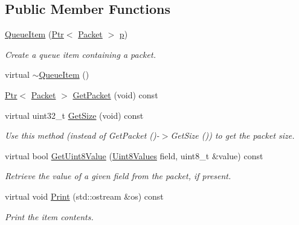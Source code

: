 \subsection*{Public Member Functions}
\begin{DoxyCompactItemize}
\item 
\hyperlink{classns3_1_1QueueItem_a9a8ffbf0ffed8686bf582062c6f69eb5}{Queue\+Item} (\hyperlink{classns3_1_1Ptr}{Ptr}$<$ \hyperlink{classns3_1_1Packet}{Packet} $>$ \hyperlink{lte__link__budget__x2__handover__measures_8m_ac9de518908a968428863f829398a4e62}{p})
\begin{DoxyCompactList}\small\item\em Create a queue item containing a packet. \end{DoxyCompactList}\item 
virtual \hyperlink{classns3_1_1QueueItem_ab61b8516ae949af67d70722c7cced634}{$\sim$\+Queue\+Item} ()
\item 
\hyperlink{classns3_1_1Ptr}{Ptr}$<$ \hyperlink{classns3_1_1Packet}{Packet} $>$ \hyperlink{classns3_1_1QueueItem_aa8c2a59b1600fa2cee783867704f9cce}{Get\+Packet} (void) const 
\item 
virtual uint32\+\_\+t \hyperlink{classns3_1_1QueueItem_afb2bd0a2029f3b59d9911fba013be2ea}{Get\+Size} (void) const 
\begin{DoxyCompactList}\small\item\em Use this method (instead of Get\+Packet ()-\/$>$Get\+Size ()) to get the packet size. \end{DoxyCompactList}\item 
virtual bool \hyperlink{classns3_1_1QueueItem_ae1a71fed25d4810dcc248dd1eb3006a0}{Get\+Uint8\+Value} (\hyperlink{classns3_1_1QueueItem_a9be6c7d46929336179fe00c3224eec9f}{Uint8\+Values} field, uint8\+\_\+t \&value) const 
\begin{DoxyCompactList}\small\item\em Retrieve the value of a given field from the packet, if present. \end{DoxyCompactList}\item 
virtual void \hyperlink{classns3_1_1QueueItem_ac6766ce23268e73d1fd46a2434994e8a}{Print} (std\+::ostream \&os) const 
\begin{DoxyCompactList}\small\item\em Print the item contents. \end{DoxyCompactList}\end{DoxyCompactItemize}
